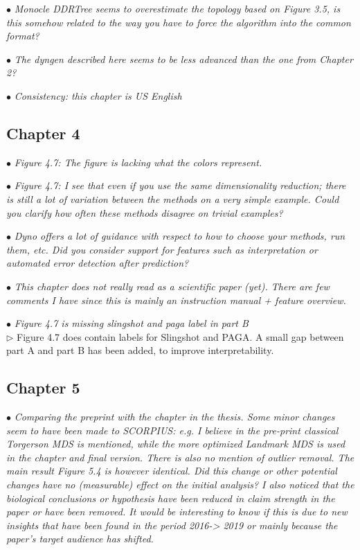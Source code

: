 \documentclass[10pt]{article}
\newcommand{\exam}[2][\  ]{\hspace{0pt}\marginpar{\color{red}#1}$\bullet$ \textit{#2}}
\newcommand{\imp}[1]{{\color{red} #1}}
\newcommand{\answ}[1]{{\color{blue} $\triangleright$ #1}}
\newcommand{\bigexclaim}{\raisebox{-0.1em}{\BigTriangleUp}\hspace{-0.32em}\llap{\small\textbf{!}}\hspace{0.32em}}
\newcommand{\tagimp}{\bigexclaim}
\newcommand{\tagtime}{{\Large $\hourglass$}}
\begin{document}
{{\exam{Monocle DDRTree seems to overestimate the topology based on Figure 3.5, is
	this somehow related to the way you have to force the algorithm into the
	common format?}

\exam{The dyngen described here seems to be less advanced than the one from
		Chapter 2?}

\exam[\tagtime]{Consistency: this chapter is US English}


\subsection{Chapter 4}

\exam{Figure 4.7: The figure is lacking what the colors represent.}

\exam{Figure 4.7: I see that even if you use the same dimensionality
	reduction; there is still a lot of variation between the methods on a very simple
	example. Could you clarify
	how often these methods disagree on trivial examples?}

\exam{Dyno offers a lot of
	guidance with respect to how to choose your methods, run them, etc. Did you
	consider support for features such as interpretation or automated error
	detection after prediction?}


\exam[\tagimp \tagtime]{\imp{This chapter does not really read as a scientific paper (yet).} There are few
	comments I have since this is mainly an instruction manual + feature overview.}



\exam{Figure 4.7 is missing slingshot and paga label in part B} \\
\answ{Figure 4.7 does contain labels for Slingshot and PAGA. A small gap between part A and part B has been added, to improve interpretability.}


\subsection{Chapter 5}

\exam[\tagimp]{Comparing the preprint with the chapter in the thesis. Some minor changes
	seem to have been made to SCORPIUS: e.g. I believe in the pre-print
	classical Torgerson MDS is mentioned, while the more optimized Landmark
	MDS is used in the chapter and final version. There is also no mention of
	outlier removal. The main result Figure 5.4 is however identical. \imp{Did this
	change or other potential changes have no (measurable) effect on the initial
	analysis? I also noticed that the biological conclusions or hypothesis have
	been reduced in claim strength in the paper or have been removed.} It would
	be interesting to know if this is due to new insights that have been found in the
	period 2016-> 2019 or mainly because the paper’s target audience has
	shifted.} \\

}}
\end{document}
